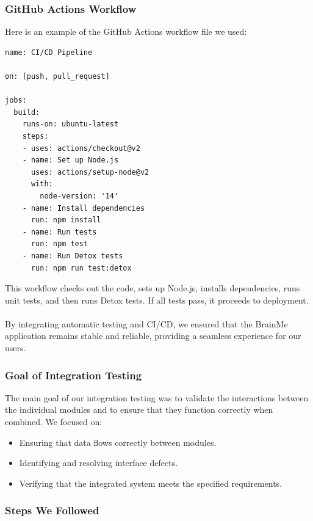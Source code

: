 \subsubsection{GitHub Actions Workflow}

Here is an example of the GitHub Actions workflow file we used:

\begin{verbatim}
name: CI/CD Pipeline

on: [push, pull_request]

jobs:
  build:
    runs-on: ubuntu-latest
    steps:
    - uses: actions/checkout@v2
    - name: Set up Node.js
      uses: actions/setup-node@v2
      with:
        node-version: '14'
    - name: Install dependencies
      run: npm install
    - name: Run tests
      run: npm test
    - name: Run Detox tests
      run: npm run test:detox
\end{verbatim}

This workflow checks out the code, sets up Node.js, installs dependencies, runs unit tests, and then runs Detox tests. If all tests pass, it proceeds to deployment. \\\\
By integrating automatic testing and CI/CD, we ensured that the BrainMe application remains stable and reliable, providing a seamless experience for our users.


\subsubsection{Goal of Integration Testing}

The main goal of our integration testing was to validate the interactions between the individual modules and to ensure that they function correctly when combined. We focused on:
\begin{itemize}
\item Ensuring that data flows correctly between modules.
\item Identifying and resolving interface defects.
\item Verifying that the integrated system meets the specified requirements.
\end{itemize}

\subsubsection{Steps We Followed}

